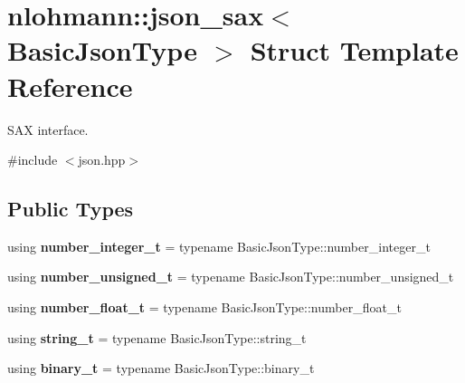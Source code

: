 \hypertarget{structnlohmann_1_1json__sax}{}\section{nlohmann\+:\+:json\+\_\+sax$<$ Basic\+Json\+Type $>$ Struct Template Reference}
\label{structnlohmann_1_1json__sax}


S\+AX interface.  




{\ttfamily \#include $<$json.\+hpp$>$}

\subsection*{Public Types}
\begin{DoxyCompactItemize}
\item 
\mbox{\label{structnlohmann_1_1json__sax_a0cef30121f02b7fee85e9708148ea0aa}} 
using {\bfseries number\+\_\+integer\+\_\+t} = typename Basic\+Json\+Type\+::number\+\_\+integer\+\_\+t
\item 
\mbox{\label{structnlohmann_1_1json__sax_a32028cc056ae0f43aaae331cdbbbf856}} 
using {\bfseries number\+\_\+unsigned\+\_\+t} = typename Basic\+Json\+Type\+::number\+\_\+unsigned\+\_\+t
\item 
\mbox{\label{structnlohmann_1_1json__sax_a390c209bffd8c4800c8f3076dc465a20}} 
using {\bfseries number\+\_\+float\+\_\+t} = typename Basic\+Json\+Type\+::number\+\_\+float\+\_\+t
\item 
\mbox{\label{structnlohmann_1_1json__sax_ae01977a9f3c5b3667b7a2929ed91061e}} 
using {\bfseries string\+\_\+t} = typename Basic\+Json\+Type\+::string\+\_\+t
\item 
\mbox{\label{structnlohmann_1_1json__sax_a0ef406ba81eef08aadf4a9ef48d742bd}} 
using {\bfseries binary\+\_\+t} = typename Basic\+Json\+Type\+::binary\+\_\+t
\end{DoxyCompactItemize}
